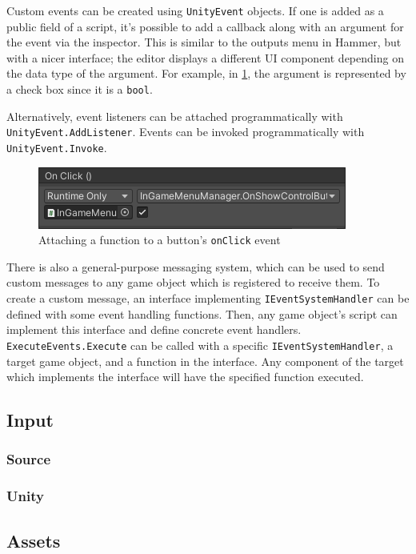 \documentclass[a4paper, 12pt]{scrartcl}
\begin{document}
Custom events can be created using \texttt{UnityEvent} objects. If one is added as a public field of a script, it's possible to add a callback along with an argument for the event via the inspector. This is similar to the outputs menu in Hammer, but with a nicer interface; the editor displays a different UI component depending on the data type of the argument. For example, in \cref{fig:unity_event_inspector}, the argument is represented by a check box since it is a \texttt{bool}.

Alternatively, event listeners can be attached programmatically with \texttt{UnityEvent\-.AddListener}. Events can be invoked programmatically with \texttt{UnityEvent.Invoke}.

\begin{figure}[!htp]
  \centering
  \includegraphics[scale=0.75]{images/unity_event_inspector.png}
  \caption{Attaching a function to a button's \texttt{onClick} event}
  \label{fig:unity_event_inspector}
\end{figure}

There is also a general-purpose messaging system, which can be used to send custom messages to any game object which is registered to receive them. To create a custom message, an interface implementing \texttt{IEventSystemHandler} can be defined with some event handling functions. Then, any game object's script can implement this interface and define concrete event handlers. \texttt{ExecuteEvents.Execute} can be called with a specific \texttt{IEventSystemHandler}, a target game object, and a function in the interface. Any component of the target which implements the interface will have the specified function executed.

\subsection{Input}
\subsubsection{Source}
\subsubsection{Unity}

\subsection{Assets}
\end{document}
